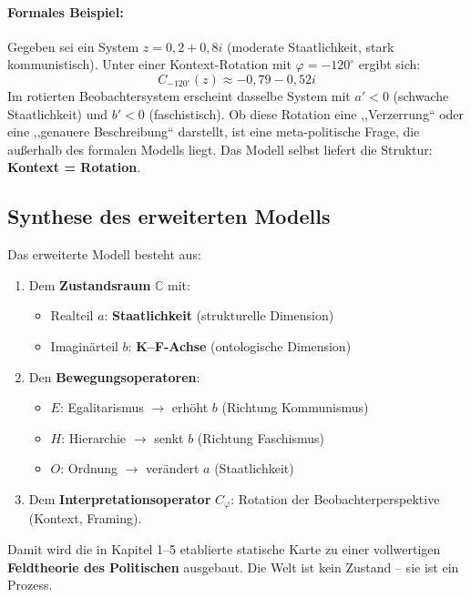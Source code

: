 \documentclass[12pt, a4paper]{article}
\begin{document}
\paragraph{Formales Beispiel:}
Gegeben sei ein System \(z = 0{,}2 + 0{,}8i\) (moderate Staatlichkeit, stark kommunistisch). Unter einer Kontext-Rotation mit \(\varphi = -120^\circ\) ergibt sich:
\[
C_{-120^\circ}(z) \approx -0{,}79 - 0{,}52i
\]
Im rotierten Beobachtersystem erscheint dasselbe System mit \(a' < 0\) (schwache Staatlichkeit) und \(b' < 0\) (faschistisch). Ob diese Rotation eine ,,Verzerrung`` oder eine ,,genauere Beschreibung`` darstellt, ist eine meta-politische Frage, die außerhalb des formalen Modells liegt. Das Modell selbst liefert die Struktur: \textbf{Kontext = Rotation}.

\subsection{Synthese des erweiterten Modells}

Das erweiterte Modell besteht aus:
\begin{enumerate}
    \item Dem \textbf{Zustandsraum} \(\mathbb{C}\) mit:
        \begin{itemize}
            \item Realteil \(a\): \textbf{Staatlichkeit} (strukturelle Dimension)
            \item Imaginärteil \(b\): \textbf{K--F-Achse} (ontologische Dimension)
        \end{itemize}
    \item Den \textbf{Bewegungsoperatoren}:
        \begin{itemize}
            \item \(E\): Egalitarismus \(\rightarrow\) erhöht \(b\) (Richtung Kommunismus)
            \item \(H\): Hierarchie \(\rightarrow\) senkt \(b\) (Richtung Faschismus)
            \item \(O\): Ordnung \(\rightarrow\) verändert \(a\) (Staatlichkeit)
        \end{itemize}
    \item Dem \textbf{Interpretationsoperator} \(C_\varphi\): Rotation der Beobachterperspektive (Kontext, Framing).
\end{enumerate}

Damit wird die in Kapitel 1--5 etablierte statische Karte zu einer vollwertigen \textbf{Feldtheorie des Politischen} ausgebaut. Die Welt ist kein Zustand -- sie ist ein Prozess.
\end{document}
